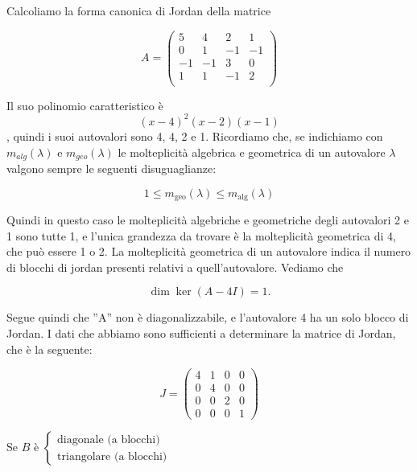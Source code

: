 \begin{example}
Calcoliamo la forma canonica di Jordan della matrice 

$$A =
\begin{pmatrix}
 5 &  4 &  2 &  1 \\
 0 &  1 & -1 & -1 \\
-1 & -1 &  3 &  0 \\ 
 1 &  1 & -1 &  2 \\
\end{pmatrix}$$

Il suo polinomio caratteristico \`e $$ (x-4)^2(x-2)(x-1) $$, quindi i suoi
 autovalori sono 4, 4, 2 e 1. Ricordiamo che, se indichiamo con
 $m_{alg}(\lambda)$ e
$m_{geo}(\lambda)$ le molteplicit\`a algebrica e geometrica di un autovalore
$\lambda$ valgono sempre le seguenti disuguaglianze:

$$ 1 \leq m_\textrm{geo}(\lambda) \leq m_\textrm{alg}(\lambda) $$

Quindi in questo caso le molteplicit\`a algebriche e geometriche degli autovalori
 2 e 1 sono tutte 1, e l'unica grandezza da trovare \`e la molteplicit\`a
geometrica di 4, che può essere 1 o 2. La molteplicit\`a geometrica di un
autovalore indica il numero di blocchi di jordan presenti relativi a 
quell'autovalore. Vediamo che

$$ \dim\ker (A-4I) = 1. $$

Segue quindi che ''A'' non \`e diagonalizzabile, e l'autovalore 4 ha un solo
blocco di Jordan. I dati che abbiamo sono sufficienti a determinare la matrice
 di Jordan, che \`e la seguente:

$$J=\begin{pmatrix}
4 & 1 & 0 & 0 \\
0 & 4 & 0 & 0 \\
0 & 0 & 2 & 0 \\
0 & 0 & 0 & 1 \end{pmatrix}$$
\end{example}
Se $B$ \`e  $\left\{
\begin{array}{l}
 \text{diagonale (a blocchi)} \\
 \text{triangolare (a blocchi)}
\end{array}
 \right.
$

